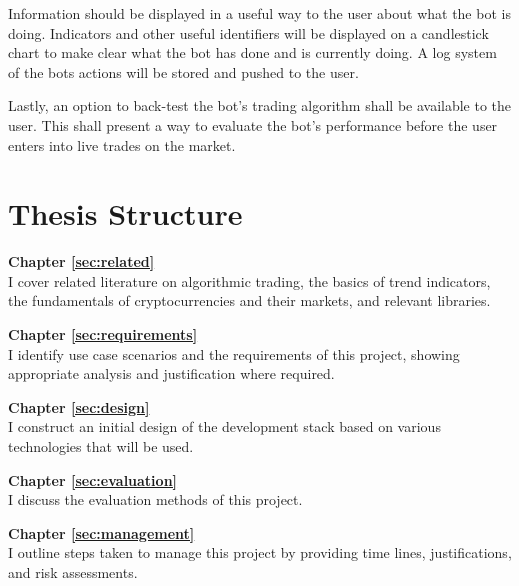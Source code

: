 Information should be displayed in a useful way to the user about what the bot is doing. Indicators and other useful identifiers will be displayed on a candlestick chart to make clear what the bot has done and is currently doing. A log system of the bots actions will be stored and pushed to the user.

Lastly, an option to back-test the bot's trading algorithm shall be available to the user. This shall present a way to evaluate the bot's performance before the user enters into live trades on the market. 



\section{Thesis Structure}
\label{sec:intro:structure}

\noindent\textbf{Chapter \ref{sec:related}} \\[0.2em]
I cover related literature on algorithmic trading, the basics of trend indicators, the fundamentals of cryptocurrencies and their markets, and relevant libraries.

\noindent\textbf{Chapter \ref{sec:requirements}} \\[0.2em]
I identify use case scenarios and the requirements of this project, showing appropriate analysis and justification where required.

\noindent\textbf{Chapter \ref{sec:design}} \\[0.2em]
I construct an initial design of the development stack based on various technologies that will be used.

\noindent\textbf{Chapter \ref{sec:evaluation}} \\[0.2em]
I discuss the evaluation methods of this project.

\noindent\textbf{Chapter \ref{sec:management}} \\[0.2em]
I outline steps taken to manage this project by providing time lines, justifications, and risk assessments.